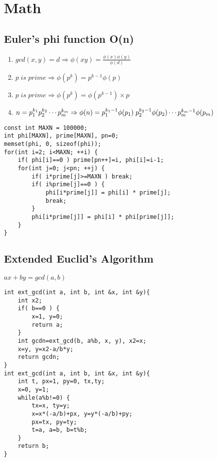 \documentclass[11pt,twocolumn,a4paper]{article}
\begin{document}
\newpage
\section{Math}
\subsection{Euler's phi function O(n)}
\begin{enumerate}[1.]
\item $gcd(x,y)=d \Rightarrow \phi(xy) = \frac{\phi(x) \phi(y)}{\phi(d)}$
\item $p\; is\; prime \Rightarrow \phi(p^k) = p^{k-1} \phi(p)$
\item $p\; is\; prime \Rightarrow \phi(p^k) = \phi(p^{k-1}) \times p$
\item $n = p_{1}^{k_1} p_{2}^{k_2} \cdots p_{m}^{k_m}\\
\Rightarrow \phi(n) = p_{1}^{k_1-1}\phi(p_1)\; p_{2}^{k_2-1}\phi(p_2) \cdots p_{m}^{k_m-1}\phi(p_m)$
\end{enumerate}

\begin{lstlisting}[label=Euler's phi function O(n)]
const int MAXN = 100000;
int phi[MAXN], prime[MAXN], pn=0;
memset(phi, 0, sizeof(phi));
for(int i=2; i<MAXN; ++i) {
	if( phi[i]==0 ) prime[pn++]=i, phi[i]=i-1;
	for(int j=0; j<pn; ++j) {
		if( i*prime[j]>=MAXN ) break;
		if( i%prime[j]==0 ) {
			phi[i*prime[j]] = phi[i] * prime[j];
			break;
		}
		phi[i*prime[j]] = phi[i] * phi[prime[j]];
	}
}
\end{lstlisting}

\subsection{Extended Euclid's Algorithm}
$ ax+by=gcd(a,b) $
\begin{lstlisting}[label=Extended Euclid's Algorithm]
int ext_gcd(int a, int b, int &x, int &y){
	int x2;
	if( b==0 ) {
		x=1, y=0;
		return a;
	}
	int gcdn=ext_gcd(b, a%b, x, y), x2=x;
	x=y, y=x2-a/b*y;
	return gcdn;
}
int ext_gcd(int a, int b, int &x, int &y){
	int t, px=1, py=0, tx,ty;
	x=0, y=1;
	while(a%b!=0) {
		tx=x, ty=y;
		x=x*(-a/b)+px, y=y*(-a/b)+py;
		px=tx, py=ty;
		t=a, a=b, b=t%b;
	}
	return b;
}
\end{lstlisting}
\end{document}
